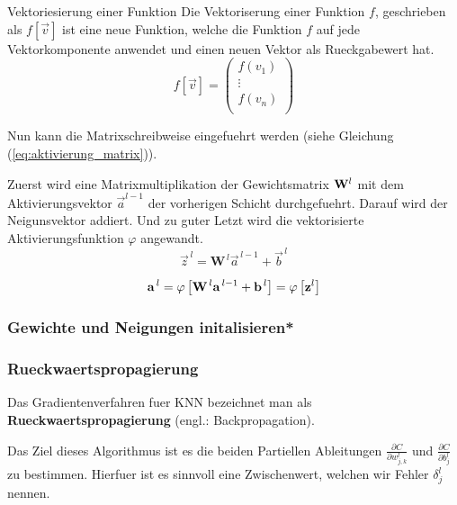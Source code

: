 \documentclass[../main]{subfiles}
\begin{document}
\begin{defbox}{Vektoriesierung einer Funktion}
  Die Vektoriserung einer Funktion $f$, geschrieben als $f[\vec{v}]$ ist eine neue Funktion, welche die Funktion $f$ auf jede Vektorkomponente anwendet und einen neuen Vektor als Rueckgabewert hat.
  \begin{equation*}
    f[\vec{v}]=
    \begin{pmatrix}
      f(v_1)\\
      \vdots \\
      f(v_n)\\
    \end{pmatrix}
  \end{equation*}
\end{defbox}

\par\medskip

Nun kann die Matrixschreibweise eingefuehrt werden (siehe Gleichung (\ref{eq:aktivierung_matrix})).\par
Zuerst wird eine Matrixmultiplikation der Gewichtsmatrix $\mathbf{W}^l$ mit dem
Aktivierungsvektor $\vec{a}^{l-1}$ der vorherigen Schicht durchgefuehrt. Darauf
wird der Neigunsvektor addiert. Und zu guter Letzt wird die vektorisierte
Aktivierungsfunktion $\varphi$ angewandt.
\begin{equation}\label{eq:aktivierung_matrix}
  \vec{z}^{\,l} = \mathbf{W}^{\,l} \vec{a}^{\,l-1} + \vec{b}^{\,l}
\end{equation}
\par
\begin{equation}\label{eq:aktivierung_matrix}
  \mathbf{a}^{\,l} = \varphi \left[\mathbf{W}^{\,l} \mathbf{a}^{\,l-1} + \mathbf{b}^{\,l} \right] = \varphi \left[ \mathbf{z}^l \right]
\end{equation}


\subsubsection{Gewichte und Neigungen initalisieren*}

\subsubsection{Rueckwaertspropagierung}\label{sec:backpropagation}
Das Gradientenverfahren fuer KNN bezeichnet man als
\textbf{Rueckwaertspropagierung} (engl.: Backpropagation).

Das Ziel dieses Algorithmus ist es die beiden Partiellen Ableitungen
$\frac{\partial C}{\partial w_{j,k}^l}$ und $\frac{\partial C}{\partial b_j^l}$
zu bestimmen. Hierfuer ist es sinnvoll eine Zwischenwert, welchen wir Fehler
$\delta_j^l$ nennen.
\end{document}
